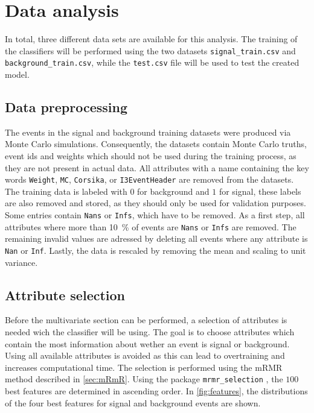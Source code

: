 \section{Data analysis}
\label{sec:Auswertung}

In total, three different data sets are available for this analysis. 
The training of the classifiers will be performed using the two datasets
\texttt{signal\_train.csv} and \texttt{background\_train.csv}, while the
\texttt{test.csv} file will be used to test the created model.

\subsection{Data preprocessing}

The events in the signal and background training datasets were produced via Monte Carlo simulations.
Consequently, the datasets contain Monte Carlo truths, event ids and weights which should not be
used during the training process, as they are not present in actual data.
All attributes with a name containing the key words \texttt{Weight}, \texttt{MC}, \texttt{Corsika}, or
\texttt{I3EventHeader} are removed from the datasets.
The training data is labeled with $0$ for background and $1$ for signal, these labels are also removed and 
stored, as they should only be used for validation purposes. Some entries contain \texttt{Nans} or
\texttt{Infs}, which have to be removed. As a first step, all attributes where more than \qty{10}{\percent}
of events are \texttt{Nans} or \texttt{Infs} are removed. The remaining invalid values are adressed by
deleting all events where any attribute is \texttt{Nan} or \texttt{Inf}.
Lastly, the data is rescaled by removing the mean and scaling to unit variance.

\subsection{Attribute selection}

Before the multivariate section can be performed, a selection of attributes is needed wich the classifier
will be using. The goal is to choose attributes which contain the most information about wether an event
is signal or background. Using all available attributes is avoided as this can lead to overtraining and
increases computational time.
The selection is performed using the mRMR method described in \autoref{sec:mRmR}. Using the package
\texttt{mrmr\_selection} \cite{mrmr}, the $100$ best features are determined in ascending order.
In \autoref{fig:features}, the distributions of the four best features for signal and background events
are shown.


